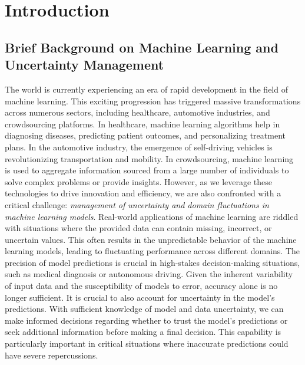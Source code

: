 \chapter{Introduction}
\section{Brief Background on Machine Learning and Uncertainty Management}
The world is currently experiencing an era of rapid development in the field of machine learning. This exciting progression has triggered massive transformations across numerous sectors, including healthcare, automotive industries, and crowdsourcing platforms. In healthcare, machine learning algorithms help in diagnosing diseases, predicting patient outcomes, and personalizing treatment plans. In the automotive industry, the emergence of self-driving vehicles is revolutionizing transportation and mobility. In crowdsourcing, machine learning is used to aggregate information sourced from a large number of individuals to solve complex problems or provide insights. However, as we leverage these technologies to drive innovation and efficiency, we are also confronted with a critical challenge: \textit{management of uncertainty and domain fluctuations in machine learning models}. Real-world applications of machine learning are riddled with situations where the provided data can contain missing, incorrect, or uncertain values. This often results in the unpredictable behavior of the machine learning models, leading to fluctuating performance across different domains.
The precision of model predictions is crucial in high-stakes decision-making situations, such as medical diagnosis or autonomous driving. Given the inherent variability of input data and the susceptibility of models to error, accuracy alone is no longer sufficient. It is crucial to also account for uncertainty in the model's predictions. With sufficient knowledge of model and data uncertainty, we can make informed decisions regarding whether to trust the model's predictions or seek additional information before making a final decision. This capability is particularly important in critical situations where inaccurate predictions could have severe repercussions.

